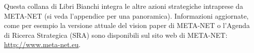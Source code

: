 \begin{multicols}{2}
Questa collana di Libri Bianchi integra le altre azioni strategiche intraprese da META-NET (si veda l'appendice per una panoramica). Informazioni aggiornate, come per esempio la versione attuale del vision paper di META-NET \cite{Meta1} o l'Agenda di Ricerca Strategica (SRA) sono disponibili sul sito web di META-NET: \url{http://www.meta-net.eu}.

\end{multicols}

\clearpage




